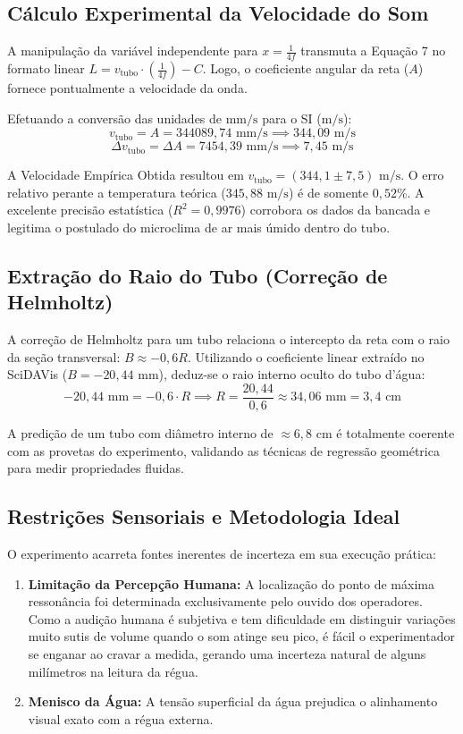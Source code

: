 \documentclass[12pt,a4paper]{article}
\begin{document}
\subsection{Cálculo Experimental da Velocidade do Som}
A manipulação da variável independente para $x = \frac{1}{4f}$ transmuta a Equação 7 no formato linear $L = v_{\text{tubo}} \cdot \left(\frac{1}{4f}\right) - C$. Logo, o coeficiente angular da reta ($A$) fornece pontualmente a velocidade da onda. 

Efetuando a conversão das unidades de $\text{mm/s}$ para o SI ($\text{m/s}$):
$$v_{\text{tubo}} = A = 344089,74\text{ mm/s} \implies 344,09\text{ m/s}$$
$$\Delta v_{\text{tubo}} = \Delta A = 7454,39\text{ mm/s} \implies 7,45\text{ m/s}$$

A Velocidade Empírica Obtida resultou em $v_{\text{tubo}} = (344,1 \pm 7,5)\text{ m/s}$. O erro relativo perante a temperatura teórica ($345,88\text{ m/s}$) é de somente $0,52\%$. A excelente precisão estatística ($R^2 = 0,9976$) corrobora os dados da bancada e legitima o postulado do microclima de ar mais úmido dentro do tubo.

\subsection{Extração do Raio do Tubo (Correção de Helmholtz)}
A correção de Helmholtz para um tubo relaciona o intercepto da reta com o raio da seção transversal: $B \approx -0,6 R$. Utilizando o coeficiente linear extraído no SciDAVis ($B = -20,44\text{ mm}$), deduz-se o raio interno oculto do tubo d'água:
$$-20,44\text{ mm} = -0,6 \cdot R \implies R = \frac{20,44}{0,6} \approx 34,06\text{ mm} = 3,4\text{ cm}$$

A predição de um tubo com diâmetro interno de $\approx 6,8\text{ cm}$ é totalmente coerente com as provetas do experimento, validando as técnicas de regressão geométrica para medir propriedades fluidas.

\subsection{Restrições Sensoriais e Metodologia Ideal}
O experimento acarreta fontes inerentes de incerteza em sua execução prática:
\begin{enumerate}
    \item \textbf{Limitação da Percepção Humana:} A localização do ponto de máxima ressonância foi determinada exclusivamente pelo ouvido dos operadores. Como a audição humana é subjetiva e tem dificuldade em distinguir variações muito sutis de volume quando o som atinge seu pico, é fácil o experimentador se enganar ao cravar a medida, gerando uma incerteza natural de alguns milímetros na leitura da régua.
    \item \textbf{Menisco da Água:} A tensão superficial da água prejudica o alinhamento visual exato com a régua externa.
\end{enumerate}
\end{document}
